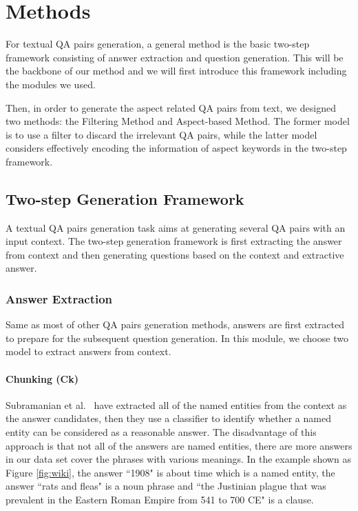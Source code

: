 \section{Methods}
\label{sec:method}
For textual QA pairs generation, a general method is the basic two-step framework consisting of answer extraction and question generation.
This will be the backbone of our method and we will first introduce this framework including the modules we used.

Then, in order to 
generate the aspect related QA pairs from text,
we designed two methods: 
the Filtering Method and Aspect-based Method.
The former model is 
to use a filter to discard the irrelevant QA pairs, 
while the latter model considers effectively encoding the information of aspect keywords in the two-step framework.

\subsection{Two-step Generation Framework}
\label{sec:two-step}
A textual QA pairs generation task aims at generating several QA pairs with an input context.
The two-step generation framework is first extracting the answer from context and then generating questions based on the context and extractive answer.
\subsubsection{Answer Extraction}
Same as most of other QA pairs generation methods, answers are first extracted to prepare for the subsequent question generation.
In this module, we choose two model to extract answers from context.
\paragraph{Chunking (Ck)}
\label{sec:chunk+nohint}
Subramanian et al.~ have extracted all of the named entities from the context as the answer candidates, then they use a classifier to identify whether a named entity can be considered as a reasonable answer.
The disadvantage of this approach is that not all of the answers are named entities, there are more answers in our data set cover the phrases with various meanings.
In the example shown as Figure \ref{fig:wiki}, the answer ``1908" is about time which is a named entity, the answer ``rats and fleas" is a noun phrase and ``the Justinian plague that was prevalent in the Eastern Roman Empire from 541 to 700 CE" is a clause.


